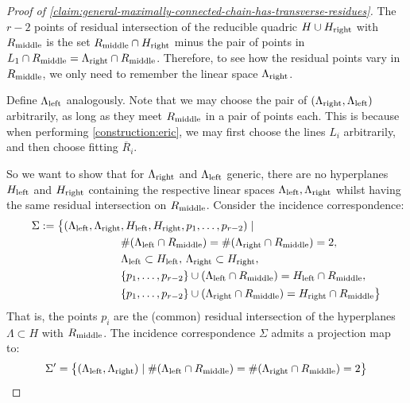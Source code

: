 \documentclass[11pt, two side, letterpaper, final]{amsart}
\begin{document}
\begin{proof}[Proof of \cref{claim:general-maximally-connected-chain-has-transverse-residues}]
    The $r-2$ points of residual intersection of the reducible quadric $ H\cup H_{\text{right}} $  with $R_{\text{middle}}$ is the set $R_{\text{middle}}\cap H_{\text{right}}$ minus the pair of points in $L_1 \cap R_{\text{middle}}= \Lambda_{\text{right}} \cap R_{\text{middle}}$. Therefore, to see how the residual points vary in $R_{\text{middle}}$, we only need to remember the linear space $\Lambda_{\text{right}}$.

    Define $\Lambda_{\text{left}}$ analogously. Note that we may choose the pair of
    $(\Lambda_{\text{right}}, \Lambda_{\text{left}})$ arbitrarily, as long as they meet $R_{\text{middle}}$ in a pair of points each. This is because when performing \cref{construction:eric}, we may first choose the lines $L_i$ arbitrarily, and then choose fitting $\overline{R}_i$.

So we want to show that for $\Lambda_{\text{right}}$ and $\Lambda_{\text{left}}$ generic, there are no hyperplanes $H_{\text{left}}$ and $H_{\text{right}}$ containing the respective linear spaces $\Lambda_{\text{left}}, \Lambda_{\text{right}}$ whilst having the same residual intersection on $R_{\text{middle}}$. Consider the incidence correspondence:
\begin{align*}
\Sigma := \big\{ (\Lambda_{\text{left}},\Lambda_{\text{right}}&, H_{\text{left}},H_{\text{right}}, p_1,\ldots ,p_{r-2}) \mid\\
& \#(\Lambda_{\text{left}} \cap R_{\text{middle}})=\#(\Lambda_{\text{right}} \cap R_{\text{middle}})=2, \\
& \Lambda_{\text{left}} \subset H_{\text{left}}, \, \Lambda_{\text{right}} \subset H_{\text{right}}, \\
& \{p_1,\ldots ,p_{r-2}\} \cup (\Lambda_{\text{left}} \cap R_{\text{middle}}) = H_{\text{left}} \cap R_{\text{middle}}, \\
& \{p_1,\ldots ,p_{r-2}\} \cup (\Lambda_{\text{right}} \cap R_{\text{middle}}) = H_{\text{right}} \cap R_{\text{middle}}
\big\}
\end{align*}
 That is, the points $p_i$ are the (common) residual intersection of the hyperplanes $\Lambda\subset H$ with
 $R_{\text{middle}}$. The incidence correspondence $\Sigma$ admits a projection map to: 
 \[
 \Sigma'= \big\{(\Lambda_{\text{left}}, \Lambda_{\text{right}}) \mid
 \#(\Lambda_{\text{left}} \cap R_{\text{middle}})=\#(\Lambda_{\text{right}} \cap R_{\text{middle}})=2
 \big\}
 \]


\end{proof}
\end{document}
